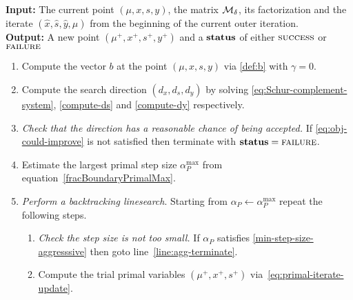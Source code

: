 \documentclass{article}
\begin{document}
\begin{algorithm}[H]
\textbf{Input:} The current point $(\mu, x, s, y)$, the matrix $\mathcal{M}_{\delta}$, its factorization and the iterate $(\hat{x}, \hat{s},  \hat{y}, \hat{\mu})$ from the beginning of the current outer iteration.  \\
\textbf{Output:} A new point $(\mu^{+}, x^{+}, s^{+}, y^{+})$ and a $\textbf{status}$ of either $\textsc{success}$ or $\textsc{failure}$
\begin{enumerate}[label*=A.{\arabic*}]
\item Compute the vector $b$ at the point $(\mu, x, s, y)$ via \eqref{def:b} with $\gamma = 0$.
\item Compute the search direction $(d_{x}, d_{s}, d_{y})$ by solving \eqref{eq:Schur-complement-system}, \eqref{compute-ds} and \eqref{compute-dy} respectively.
\item \emph{Check that the direction has a reasonable chance of being accepted.} If \eqref{eq:obj-could-improve} is not satisfied then terminate with $\textbf{status} = \textsc{failure}$.
\item Estimate the largest primal step size $\alpha^{\max}_{P}$ from equation~\eqref{fracBoundaryPrimalMax}.
\item \label{agg:line:back-track} \emph{Perform a backtracking linesearch}. Starting from $\alpha_{P} \gets \alpha^{\max}_{P}$ repeat the following steps.
\begin{enumerate}[label*=.{\arabic*}]
\item \label{line:agg-back-too-small} \emph{Check the step size is not too small.} If $\alpha_{P}$ satisfies \eqref{min-step-size-aggresssive} then goto line~\ref{line:agg-terminate}.
\item Compute the trial primal variables $(\mu^{+}, x^{+}, s^{+})$ via~\eqref{eq:primal-iterate-update}.

\end{enumerate}
\end{enumerate}
\end{algorithm}
\end{document}
